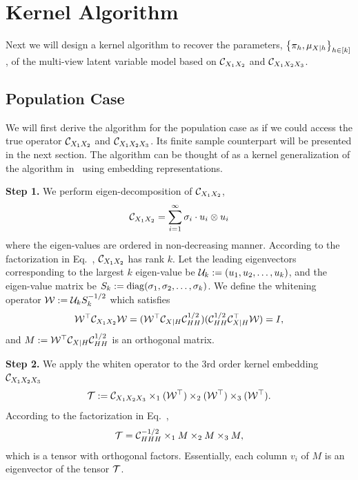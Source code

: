 \documentclass{article}
\newcommand{\Note}[1]{{\color{red}{\bf\sf [note: #1]}}}
\begin{document}
\section{Kernel Algorithm}

Next we will design a kernel algorithm to recover the parameters, $\left\{\pi_h, \mu_{X|h}\right\}_{h \in [k]}$, of the multi-view latent variable model based on $\mathcal{C}_{X_1 X_2}$ and $\mathcal{C}_{X_1 X_2 X_3}$.

\Note{say something about how direct the replacement is.}

\subsection{Population Case}

We will first derive the algorithm for the population case as if we could access the true operator $\mathcal{C}_{X_1 X_2}$ and $\mathcal{C}_{X_1 X_2 X_3}$. Its finite sample counterpart will be presented in the next section. The algorithm can be thought of as a kernel generalization of the algorithm in~\cite{AnandkumarEtal:community12} using embedding representations.

{\bf Step 1.} We perform eigen-decomposition of $\mathcal{C}_{X_1 X_2}$,
$$\mathcal{C}_{X_1 X_2} = \sum_{i=1}^{\infty} \sigma_i \cdot u_i \otimes u_i$$
where the eigen-values are ordered in non-decreasing manner.
According to the factorization in Eq.~, $\mathcal{C}_{X_1 X_2}$ has rank $k$.
Let the leading eigenvectors corresponding to the largest $k$ eigen-value be  $\mathcal{U}_k:=(u_1,u_2,\ldots,u_k)$, and the eigen-value matrix be $S_k:=\mathop{\mathrm{diag}}(\sigma_1,\sigma_2,\ldots,\sigma_k)$. We define the whitening operator $\mathcal{W}:= \mathcal{U}_k S_k^{-1/2}$ which satisfies
\begin{align*}
  \mathcal{W}^\top \mathcal{C}_{X_1X_2} \mathcal{W} = (\mathcal{W}^\top \mathcal{C}_{X|H} \mathcal{C}_{HH}^{1/2}) (\mathcal{C}_{HH}^{1/2} \mathcal{C}_{X|H}^\top \mathcal{W}) = I,
\end{align*}
and $M:=\mathcal{W}^\top \mathcal{C}_{X|H} \mathcal{C}_{HH}^{1/2}$ is an orthogonal matrix.

{\bf Step 2.} We apply the whiten operator to the 3rd order kernel embedding $\mathcal{C}_{X_1 X_2 X_3}$
$$
  {\mathcal{T}} := \mathcal{C}_{X_1 X_2 X_3} \times_1 (\mathcal{W}^\top) \times_2 (\mathcal{W}^\top) \times_3 (\mathcal{W}^\top).
$$
According to the factorization in Eq.~,
$$
  {\mathcal{T}} = \mathcal{C}_{HHH}^{-1/2} \times_1 M \times_2 M \times_3 M,
$$
which is a tensor with orthogonal factors. Essentially, each column $v_i$ of $M$ is an eigenvector of the tensor ${\mathcal{T}}$.
\end{document}

